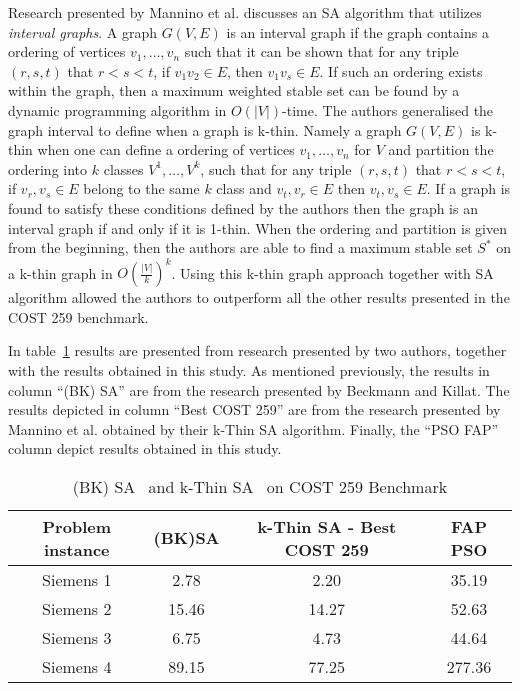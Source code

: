 Research presented by Mannino et al.\cite{MaOrRi02} discusses an \gls{SA} algorithm that utilizes \emph{interval graphs}. A graph $G(V,E)$ is an interval graph if the graph contains a ordering of vertices ${v_1,\dots,v_n}$ such that it can be shown that for any triple $(r,s,t)$ that $r < s < t$, if $v_1v_2 \in E$, then $v_1v_s \in E$. If such an ordering exists within the graph, then a maximum weighted stable set can be found by a dynamic programming algorithm in $O(|V|)$-time. The authors generalised the graph interval to define when a graph is k-thin. Namely a graph $G(V,E)$ is k-thin when one can define a ordering of vertices ${v_1,\dots,v_n}$ for $V$ and partition the ordering into $k$ classes $V^1,\dots,V^k$, such that for any triple $(r,s,t)$ that $r < s < t$, if $v_r,v_s \in E$ belong to the same $k$ class and $v_t,v_r \in E$ then $v_t,v_s \in E$. If a graph is found to satisfy these conditions defined by the authors then the graph is an interval graph if and only if it is 1-thin. When the ordering and partition is given from the beginning, then the authors are able to find a maximum stable set $S^*$ on a k-thin graph in $O(\frac{|V|}{k})^k$. Using this k-thin graph approach together with \gls{SA} algorithm allowed the authors to outperform all the other results presented in the \gls{COST} 259 benchmark. 

In table~\ref{tab:SA} results are presented from research presented by two authors, together with the results obtained in this study. As mentioned previously, the results in column ``(BK) \gls{SA}'' are from the research presented by Beckmann and Killat\cite{BeKi99a}. The results depicted in column ``Best \gls{COST} 259'' are from the research presented by Mannino et al.\cite{MaOrRi02} obtained by their k-Thin \gls{SA} algorithm. Finally, the ``PSO FAP'' column depict results obtained in this study.
\begin{table}[H]
\centering
	\begin{tabular}{cccc}
	\toprule
    Problem instance & (BK)\gls{SA} & k-Thin SA - Best \gls{COST} 259 & FAP PSO\\
    \midrule
    Siemens 1 & 2.78 & 2.20 & 35.19\\
    Siemens 2 & 15.46 & 14.27 & 52.63\\
    Siemens 3 & 6.75 & 4.73 & 44.64\\
    Siemens 4 & 89.15 & 77.25 & 277.36\\
    \bottomrule
	\end{tabular}
    \caption{(BK) SA~\cite{BeKi99a} and k-Thin SA~\cite{MaOrRi02} on \gls{COST} 259 Benchmark}
\label{tab:SA}
\end{table}


